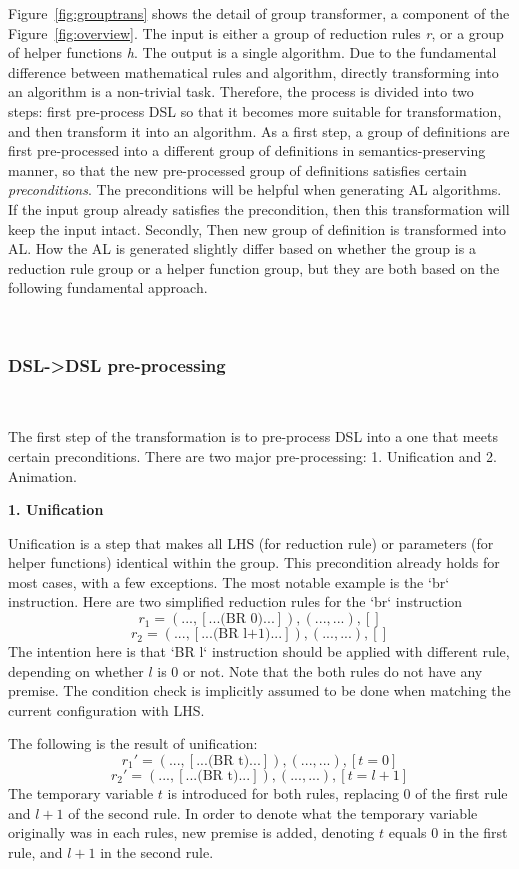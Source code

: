 Figure~\ref{fig:grouptrans} shows the detail of group transformer, a component of the Figure~\ref{fig:overview}.
The input is either a group of reduction rules \textit{r}, or a group of helper functions \textit{h}.
The output is a single algorithm.
Due to the fundamental difference between mathematical rules and algorithm,
directly transforming into an algorithm is a non-trivial task.
Therefore, the process is divided into two steps: first pre-process DSL so that
it becomes more suitable for transformation, and then transform it into an algorithm.
As a first step, a group of definitions are first pre-processed into a
different group of definitions in semantics-preserving manner,
so that the new pre-processed group of definitions satisfies certain \textit{preconditions}.
The preconditions will be helpful when generating AL algorithms.
If the input group already satisfies the precondition, then this transformation will keep the input intact.
Secondly, Then new group of definition is transformed into AL.
How the AL is generated slightly differ based on whether the group is a reduction rule group or a helper function
group, but they are both based on the following fundamental approach.

~

\subsubsection{\textbf{DSL->DSL pre-processing}}~

The first step of the transformation is to pre-process DSL into a one that meets certain preconditions.
There are two major pre-processing: 1. Unification and
2. Animation.

\textbf{1. Unification}

Unification is a step that makes all LHS (for reduction rule) or parameters
(for helper functions) identical within the group.
This precondition already holds for most cases, with a few exceptions.
The most notable example is the `br` instruction.
Here are two simplified reduction rules for the `br` instruction
\[
r_1 = (..., [... \text{(BR 0)} ...]),  (..., ...), []
\]
\[
r_2 = (..., [... \text{(BR l+1)} ...]),  (..., ...), []
\]
The intention here is that `BR l` instruction should be applied with different rule,
depending on whether $l$ is 0 or not.
Note that the both rules do not have any premise. The condition check is implicitly assumed to be
done when matching the current configuration with LHS.

The following is the result of unification:
\[
r_1' = (..., [... \text{(BR t)} ...]),  (..., ...), [t = 0]
\]
\[
r_2' = (..., [... \text{(BR t)} ...]),  (..., ...), [t = l + 1]
\]
The temporary variable $t$ is introduced for both rules, replacing 0 of the first rule and
$l+1$ of the second rule. In order to denote what the temporary variable originally was
in each rules, new premise is added, denoting $t$ equals 0 in the first rule, and $l+1$ in the second rule.

